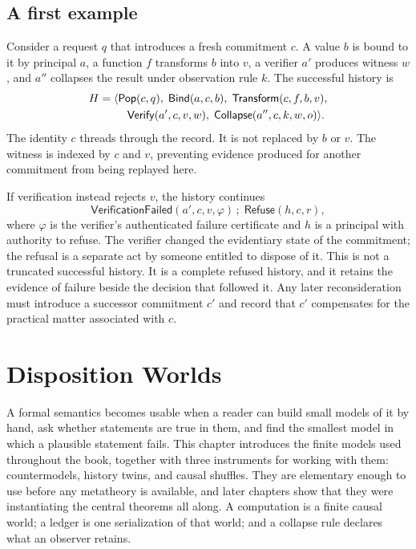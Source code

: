 \documentclass[11pt,openany]{book}
\theoremstyle{remark}
\newcommand{\Pop}{\mathsf{Pop}}
\newcommand{\Refuse}{\mathsf{Refuse}}
\newcommand{\Bind}{\mathsf{Bind}}
\newcommand{\Transform}{\mathsf{Transform}}
\newcommand{\Verify}{\mathsf{Verify}}
\newcommand{\Collapse}{\mathsf{Collapse}}
\begin{document}
\section{A first example}

Consider a request $q$ that introduces a fresh commitment $c$. A value
$b$ is bound to it by principal $a$, a function $f$ transforms $b$ into
$v$, a verifier $a'$ produces witness $w$, and $a''$ collapses the result
under observation rule $k$. The successful history is
\[
\begin{aligned}
H={}&\langle
  \Pop(c,q),\;
  \Bind(a,c,b),\;
  \Transform(c,f,b,v),\\
 &\hspace{1.2em}\Verify(a',c,v,w),\;
  \Collapse(a'',c,k,w,o)
\rangle .
\end{aligned}
\]
The identity $c$ threads through the record. It is not replaced by $b$ or
$v$. The witness is indexed by $c$ and $v$, preventing evidence produced
for another commitment from being replayed here.

If verification instead rejects $v$, the history continues
\[
  \mathsf{VerificationFailed}(a',c,v,\varphi)\,;\;\Refuse(h,c,r),
\]
where $\varphi$ is the verifier's authenticated failure certificate and
$h$ is a principal with authority to refuse. The verifier changed the
evidentiary state of the commitment; the refusal is a separate act by
someone entitled to dispose of it. This is not a truncated successful
history. It is a complete refused history, and it retains the evidence of
failure beside the decision that followed it. Any later
reconsideration must introduce a successor commitment $c'$ and record that
$c'$ compensates for the practical matter associated with $c$.

\chapter{Disposition Worlds}
\label{ch:worlds}

A formal semantics becomes usable when a reader can build small models of
it by hand, ask whether statements are true in them, and find the smallest
model in which a plausible statement fails. This chapter introduces the
finite models used throughout the book, together with three instruments
for working with them: countermodels, history twins, and causal shuffles.
They are elementary enough to use before any metatheory is available, and
later chapters show that they were instantiating the central theorems all
along. A computation is a finite causal world; a ledger is one
serialization of that world; and a collapse rule declares what an observer
retains.
\end{document}

